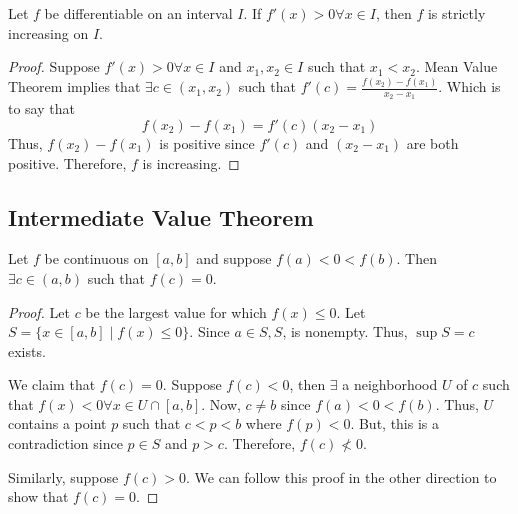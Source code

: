 \begin{theorem}
    Let $f$ be differentiable on an interval $I$. If $f'(x) > 0 \forall x \in I$, then $f$ is strictly increasing on $I$.
\end{theorem}
\begin{proof}
    Suppose $f'(x) > 0 \forall x \in I$ and $x_1, x_2 \in I$ such that $x_1 < x_2$. Mean Value Theorem implies that $\exists c \in (x_1, x_2)$ such that $f'(c) = \frac{f(x_2) - f(x_1)}{x_2 - x_1}$. Which is to say that $$f(x_2) - f(x_1) = f'(c) (x_2 - x_1)$$ Thus, $f(x_2) - f(x_1)$ is positive since $f'(c)$ and $(x_2 - x_1)$ are both positive. Therefore, $f$ is increasing.
\end{proof}

\subsection{Intermediate Value Theorem}
\begin{theorem}
    Let $f$ be continuous on $[a,b]$ and suppose $f(a) < 0 < f(b)$. Then $\exists c \in (a,b)$ such that $f(c) = 0$.
\end{theorem}
\begin{proof}
    Let $c$ be the largest value for which $f(x) \leq 0$. Let $S = \{x \in [a, b] \mid f(x) \leq 0\}$. Since $a \in S, S$, is nonempty. Thus, $\sup S = c$ exists.

    We claim that $f(c) = 0$. Suppose $f(c) < 0$, then $\exists$ a neighborhood $U$ of $c$ such that $f(x) < 0 \forall x \in U \cap [a, b]$. Now, $c \neq b$ since $f(a) < 0 < f(b)$. Thus, $U$ contains a point $p$ such that $c < p < b$ where $f(p) < 0$. But, this is a contradiction since $p \in S$ and $p > c$. Therefore, $f(c) \not< 0$.

    Similarly, suppose $f(c) > 0$. We can follow this proof in the other direction to show that $f(c) = 0$.
\end{proof}